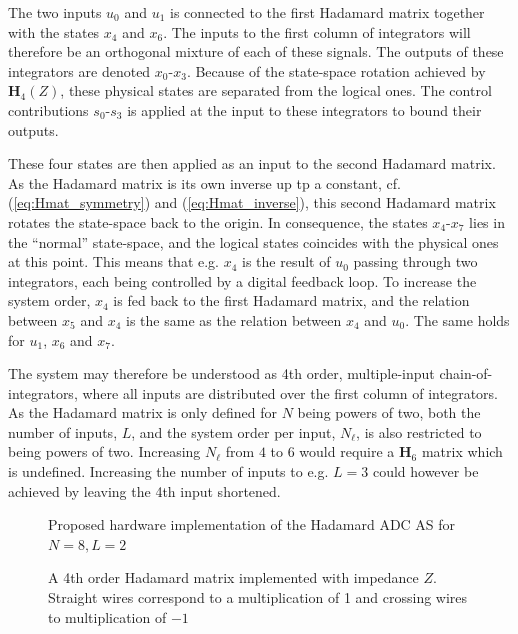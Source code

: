 The two inputs $u_0$ and $u_1$ is connected to the first Hadamard matrix together with the states $x_4$ and $x_6$. The inputs to the first column of integrators will therefore be an orthogonal mixture of each of these signals. The outputs of these integrators are denoted $x_0$-$x_3$. Because of the state-space rotation achieved by $\bm{H}_4(Z)$, these physical states are separated from the logical ones. The control contributions $s_0$-$s_3$ is applied at the input to these integrators to bound their outputs.

These four states are then applied as an input to the second Hadamard matrix. As the Hadamard matrix is its own inverse up tp a constant, cf. (\ref{eq:Hmat_symmetry}) and (\ref{eq:Hmat_inverse}), this second Hadamard matrix rotates the state-space back to the origin. In consequence, the states $x_4$-$x_7$ lies in the \enquote{normal} state-space, and the logical states coincides with the physical ones at this point. This means that e.g. $x_4$ is the result of $u_0$ passing through two integrators, each being controlled by a digital feedback loop. To increase the system order, $x_4$ is fed back to the first Hadamard matrix, and the relation between $x_5$ and $x_4$ is the same as the relation between $x_4$ and $u_0$. The same holds for $u_1$, $x_6$ and $x_7$.

The system may therefore be understood as 4th order, multiple-input chain-of-integrators, where all inputs are distributed over the first column of integrators. As the Hadamard matrix is only defined for $N$ being powers of two, both the number of inputs, $L$, and the system order per input, $N_{\ell}$, is also restricted to being powers of two. Increasing $N_\ell$ from $4$ to $6$ would require a $\bm{H}_6$ matrix which is undefined. Increasing the number of inputs to e.g. $L=3$ could however be achieved by leaving the 4th input shortened.

\begin{figure}
    \centering
    
    \caption{Proposed hardware implementation of the Hadamard ADC AS for $N=8, L=2$}
    \label{fig:HCI_AS_01}
\end{figure}

\begin{figure}[htbp]
    \centering
    
    \caption{A 4th order Hadamard matrix implemented with impedance $Z$. Straight wires correspond to a multiplication of 1 and crossing wires to multiplication of $-1$}
    \label{fig:H4Z}
\end{figure}

